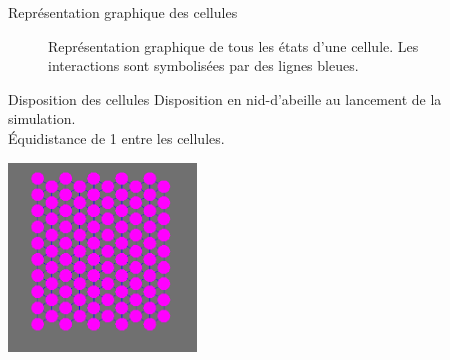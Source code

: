 \documentclass{beamer}
\begin{document}
\begin{frame}{Représentation graphique des cellules}
  \begin{figure}
    \caption{Représentation graphique de tous les états d'une cellule. Les interactions sont symbolisées par des lignes bleues.}
  \end{figure}
\end{frame}

\begin{frame}{Disposition des cellules}
  Disposition en nid-d'abeille au lancement de la simulation.\\
  Équidistance de 1 entre les cellules.
  \begin{center}
    \includegraphics[width=5cm]{Images/hexagone.png}
  \end{center}
\end{frame}
\end{document}

